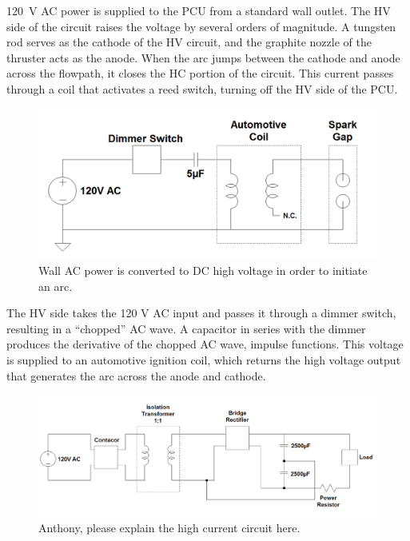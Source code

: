 \documentclass[journal]{IEEEtran}
\begin{document}
\SI{120}{\volt} AC power is supplied to the PCU from a standard wall outlet.
The HV side of the circuit raises the voltage by several orders of magnitude.
A tungsten rod serves as the cathode of the HV circuit, and the graphite nozzle of the thruster acts as the anode.  When the arc jumps between the cathode and anode across the flowpath, it closes the HC portion of the circuit.
This current passes through a coil that activates a reed switch, turning off the HV side of the PCU.\@

\begin{figure}[htp]
  \includegraphics[width=\linewidth]{figs/hv-schematic.png}
  \caption{Wall AC power is converted to DC high voltage in order to initiate an arc.
\label{fig:hv-circuit}
}
\end{figure}

The HV side takes the 120 V AC input and passes it through a dimmer switch, resulting in a ``chopped'' AC wave.
A capacitor in series with the dimmer produces the derivative of the chopped AC wave, impulse functions.
This voltage is supplied to an automotive ignition coil, which returns the high voltage output that generates the arc across the anode and cathode.

\begin{figure}[htp]
  \includegraphics[width=\linewidth]{figs/hc-schematic.png}
  \caption{Anthony, please explain the high current circuit here.
\label{fig:hc-circuit}
}
\end{figure}
\end{document}
